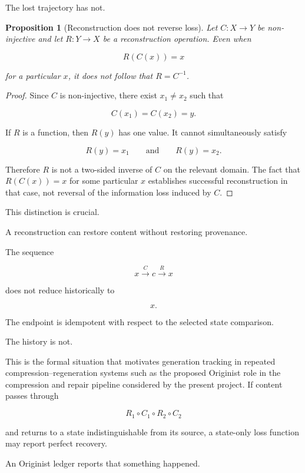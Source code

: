 \documentclass[
  11pt,
  a4paper,
  DIV=12,
  BCOR=0mm,
  parskip=half-
]{scrartcl}
\theoremstyle{definition}
\theoremstyle{plain}
\newtheorem{proposition}[definition]{Proposition}
\theoremstyle{remark}
\begin{document}
The lost trajectory has not.

\begin{proposition}[Reconstruction does not reverse loss]
\label{prop:reconstruction-not-inverse}
Let \(C:X\rightarrow Y\) be non-injective and let \(R:Y\rightarrow X\) be a
reconstruction operation. Even when

\[
  R(C(x))=x
\]

for a particular \(x\), it does not follow that \(R=C^{-1}\).
\end{proposition}

\begin{proof}
Since \(C\) is non-injective, there exist \(x_1\neq x_2\) such that

\[
  C(x_1)=C(x_2)=y.
\]

If \(R\) is a function, then \(R(y)\) has one value. It cannot simultaneously
satisfy

\[
  R(y)=x_1
  \qquad\text{and}\qquad
  R(y)=x_2.
\]

Therefore \(R\) is not a two-sided inverse of \(C\) on the relevant domain.
The fact that \(R(C(x))=x\) for some particular \(x\) establishes successful
reconstruction in that case, not reversal of the information loss induced by
\(C\).
\end{proof}

This distinction is crucial.

A reconstruction can restore content without restoring provenance.

The sequence

\[
  x
  \xrightarrow{C}
  c
  \xrightarrow{R}
  x
\]

does not reduce historically to

\[
  x.
\]

The endpoint is idempotent with respect to the selected state comparison.

The history is not.

This is the formal situation that motivates generation tracking in repeated
compression--regeneration systems such as the proposed Originist role in the
compression and repair pipeline considered by the present project. If content
passes through

\[
  R_1
  \circ
  C_1
  \circ
  R_2
  \circ
  C_2
\]

and returns to a state indistinguishable from its source, a state-only loss
function may report perfect recovery.

An Originist ledger reports that something happened.
\end{document}
